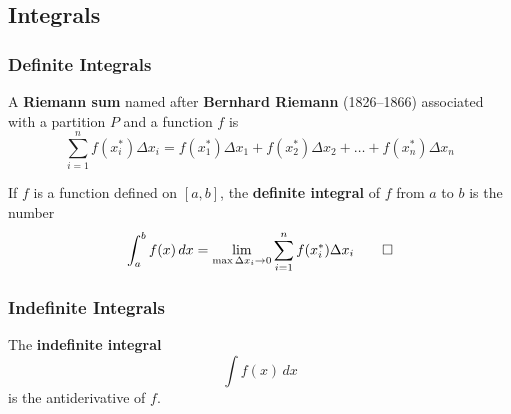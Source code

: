 \subsection{Integrals}
\subsubsection{Definite Integrals}
A \textbf{Riemann sum} named after \textbf{Bernhard Riemann} (1826--1866)
associated with a partition \(P\) and a function \(f\) is
\[\sum_{i=1}^n f(x_i^*)\Delta x_i=f(x_1^*)\Delta x_1+f(x_2^*)\Delta x_2
+\dots+f(x_n^*)\Delta x_n\]
\begin{definition}
    If \(f\) is a function defined on \([a,b]\), the \textbf{definite integral}
    of \(f\) from \(a\) to \(b\) is the number
    \[\int_a^b f(x)\,dx=\lim_{\max\Delta x_i\to 0}
    \sum_{i=1}^n f(x_i^*)\Delta x_i\qedhere\]
\end{definition}

\subsubsection{Indefinite Integrals}
\begin{definition}
    The \textbf{indefinite integral} \[\int f(x)\,dx\] is the
    antiderivative of \(f\).
\end{definition}